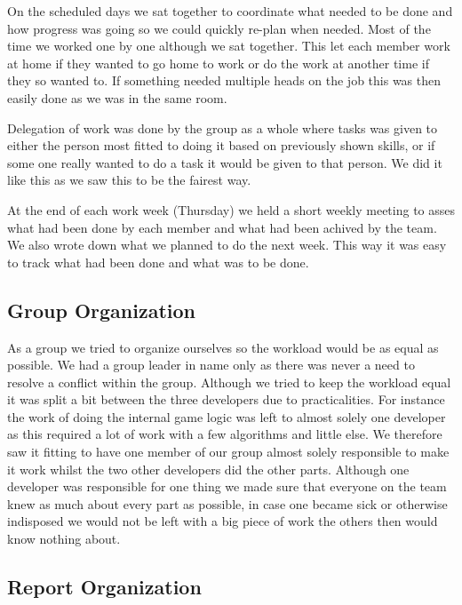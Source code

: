 On the scheduled days we sat together to coordinate what needed to be done and how progress was going so we could quickly re-plan when needed.
Most of the time we worked one by one although we sat together.
This let each member work at home if they wanted to go home to work or do the work at another time if they so wanted to.
If something needed multiple heads on the job this was then easily done as we was in the same room.

Delegation of work was done by the group as a whole where tasks was given to either the person most fitted to doing it based on previously shown skills, or if some one really wanted to do a task it would be given to that person. We did it like this as we saw this to be the fairest way.

At the end of each work week (Thursday) we held a short weekly meeting to asses what had been done by each member and what had been achived by the team.
We also wrote down what we planned to do the next week.
This way it was easy to track what had been done and what was to be done.

\subsection{Group Organization}
As a group we tried to organize ourselves so the workload would be as equal as possible. 
We had a group leader in name only as there was never a need to resolve a conflict within the group.
Although we tried to keep the workload equal it was split a bit between the three developers due to practicalities. 
For instance the work of doing the internal game logic was left to almost solely one developer as this required a lot of work with a few algorithms and little else.
We therefore saw it fitting to have one member of our group almost solely responsible to make it work whilst the two other developers did the other parts.
Although one developer was responsible for one thing we made sure that everyone on the team knew as much about every part as possible, in case one became sick or otherwise indisposed we would not be left with a big piece of work the others then would know nothing about.


\subsection{Report Organization}


